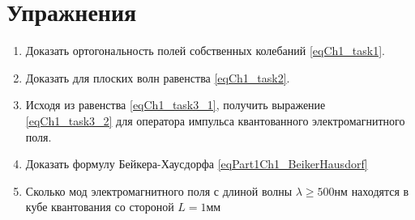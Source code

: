 \section{Упражнения}
\begin{enumerate}
\item Доказать ортогональность полей собственных колебаний
  \eqref{eqCh1_task1}.  
\item Доказать для плоских волн равенства \eqref{eqCh1_task2}.
\item Исходя из равенства \eqref{eqCh1_task3_1}, получить выражение
  \eqref{eqCh1_task3_2} для оператора импульса квантованного
  электромагнитного поля. 
\item Доказать формулу Бейкера-Хаусдорфа \eqref{eqPart1Ch1_BeikerHausdorf}
\item Сколько мод \label{qQuantelNumberMods} электромагнитного поля с
  длиной волны $\lambda \ge 500 \mbox{нм}$ находятся в кубе
  квантования со стороной $L=1 \mbox{мм}$
  \cite{courseIntroQuantumOpticsCoursera} 
\end{enumerate}
